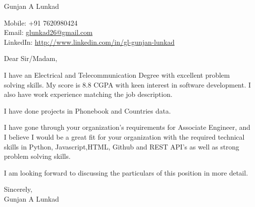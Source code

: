 \documentclass[a4paper,12pt]{letter}
\begin{document}
\begin{letter}{}

    \begin{center}
        Gunjan A Lunkad
    \end{center}

    \begin{flushright}
        Mobile: +91 7620980424 \\
        Email: \href{mailto:glunkad26@gmail.com}{glunkad26@gmail.com} \\
        LinkedIn: \href{http://www.linkedin.com/in/gl-gunjan-lunkad}{http://www.linkedin.com/in/gl-gunjan-lunkad}
    \end{flushright}

    \opening{Dear Sir/Madam,}

    I have an Electrical and Telecommunication Degree with excellent problem solving skills. My score is 8.8 CGPA with keen interest in software development. I also have work experience matching the job description.

    I have done projects in Phonebook and Countries data.

    I have gone through your organization's requirements for Associate  Engineer, and I believe I would be a great fit for your organization with the required technical skills in Python, Javascript,HTML, Github and REST API's as well as strong problem solving skills.

    I am looking forward to discussing the particulars of this position in more detail.

    \closing{Sincerely, \\ Gunjan A Lunkad }
    \vspace{2cm}  %


\end{letter}
\end{document}
